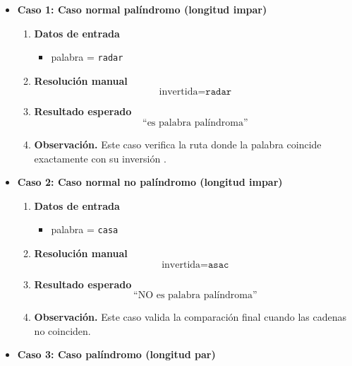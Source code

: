 \documentclass[12pt,twoside]{book}
\begin{document}
						\begin{itemize}
							\item \textbf{Caso 1: Caso normal palíndromo (longitud impar)}
							
							\begin{enumerate}
								\item \textbf{Datos de entrada}
								\begin{itemize}
									\item palabra = \texttt{radar}
								\end{itemize}
								\item \textbf{Resolución manual}
								\[
								\text{invertida} = \texttt{radar}
								\]
								\item \textbf{Resultado esperado}
								\[
								\text{``es palabra palíndroma''}
								\]
								\item \textbf{Observación.} Este caso verifica la ruta donde la palabra coincide exactamente con su inversión \cite{Joyanes2007Fundamentos}.
							\end{enumerate}
							
							\item \textbf{Caso 2: Caso normal no palíndromo (longitud impar)}
							
							\begin{enumerate}
								\item \textbf{Datos de entrada}
								\begin{itemize}
									\item palabra = \texttt{casa}
								\end{itemize}
								\item \textbf{Resolución manual}
								\[
								\text{invertida} = \texttt{asac}
								\]
								\item \textbf{Resultado esperado}
								\[
								\text{``NO es palabra palíndroma''}
								\]
								\item \textbf{Observación.} Este caso valida la comparación final cuando las cadenas no coinciden.
							\end{enumerate}
							
							\item \textbf{Caso 3: Caso palíndromo (longitud par)}
							

\end{itemize}
\end{document}
